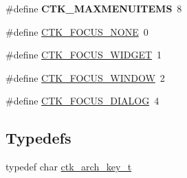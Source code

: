 \begin{DoxyCompactItemize}
\item 
\hypertarget{group__ctkdraw_ga4fd23428c36ad11a66c804ade2bb49c4}{}\#define {\bfseries C\+T\+K\+\_\+\+M\+A\+X\+M\+E\+N\+U\+I\+T\+E\+M\+S}~8\label{group__ctkdraw_ga4fd23428c36ad11a66c804ade2bb49c4}

\item 
\#define \hyperlink{group__ctkdraw_ga8c298ccc15c01a838e11d4391629f7bf}{C\+T\+K\+\_\+\+F\+O\+C\+U\+S\+\_\+\+N\+O\+N\+E}~0
\item 
\#define \hyperlink{group__ctkdraw_gafa49312af6ac5411ecbc0c11caa6fcf2}{C\+T\+K\+\_\+\+F\+O\+C\+U\+S\+\_\+\+W\+I\+D\+G\+E\+T}~1
\item 
\#define \hyperlink{group__ctkdraw_gaa6bcc3324b455c546e94ba330f6c719b}{C\+T\+K\+\_\+\+F\+O\+C\+U\+S\+\_\+\+W\+I\+N\+D\+O\+W}~2
\item 
\#define \hyperlink{group__ctkdraw_ga609601e009471eb21c7ff906358a2faf}{C\+T\+K\+\_\+\+F\+O\+C\+U\+S\+\_\+\+D\+I\+A\+L\+O\+G}~4
\end{DoxyCompactItemize}
\subsection*{Typedefs}
\begin{DoxyCompactItemize}
\item 
typedef char \hyperlink{group__ctkdraw_gaa6eb41324497b3d828d208c0efa6fa90}{ctk\+\_\+arch\+\_\+key\+\_\+t}
\end{DoxyCompactItemize}
